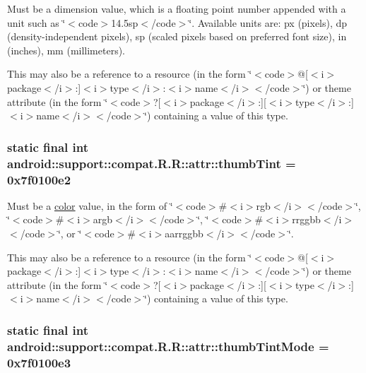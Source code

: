 Must be a dimension value, which is a floating point number appended with a unit such as \char`\"{}$<$code$>$14.5sp$<$/code$>$\char`\"{}. Available units are: px (pixels), dp (density-independent pixels), sp (scaled pixels based on preferred font size), in (inches), mm (millimeters). 

This may also be a reference to a resource (in the form \char`\"{}$<$code$>$@\mbox{[}$<$i$>$package$<$/i$>$:\mbox{]}$<$i$>$type$<$/i$>$:$<$i$>$name$<$/i$>$$<$/code$>$\char`\"{}) or theme attribute (in the form \char`\"{}$<$code$>$?\mbox{[}$<$i$>$package$<$/i$>$:\mbox{]}\mbox{[}$<$i$>$type$<$/i$>$:\mbox{]}$<$i$>$name$<$/i$>$$<$/code$>$\char`\"{}) containing a value of this type. \hypertarget{classandroid_1_1support_1_1compat_1_1_r_1_1attr_f9d5230d7f040b4a213add0d97d4421b}{
\subsubsection[{thumbTint}]{\setlength{\rightskip}{0pt plus 5cm}static final int android::support::compat.R.R::attr::thumbTint = 0x7f0100e2}}
\label{classandroid_1_1support_1_1compat_1_1_r_1_1attr_f9d5230d7f040b4a213add0d97d4421b}


Must be a \hyperlink{classandroid_1_1support_1_1compat_1_1_r_1_1color}{color} value, in the form of \char`\"{}$<$code$>$\#$<$i$>$rgb$<$/i$>$$<$/code$>$\char`\"{}, \char`\"{}$<$code$>$\#$<$i$>$argb$<$/i$>$$<$/code$>$\char`\"{}, \char`\"{}$<$code$>$\#$<$i$>$rrggbb$<$/i$>$$<$/code$>$\char`\"{}, or \char`\"{}$<$code$>$\#$<$i$>$aarrggbb$<$/i$>$$<$/code$>$\char`\"{}. 

This may also be a reference to a resource (in the form \char`\"{}$<$code$>$@\mbox{[}$<$i$>$package$<$/i$>$:\mbox{]}$<$i$>$type$<$/i$>$:$<$i$>$name$<$/i$>$$<$/code$>$\char`\"{}) or theme attribute (in the form \char`\"{}$<$code$>$?\mbox{[}$<$i$>$package$<$/i$>$:\mbox{]}\mbox{[}$<$i$>$type$<$/i$>$:\mbox{]}$<$i$>$name$<$/i$>$$<$/code$>$\char`\"{}) containing a value of this type. \hypertarget{classandroid_1_1support_1_1compat_1_1_r_1_1attr_39e61c27a8765be63b69ba7ac9e34581}{
\subsubsection[{thumbTintMode}]{\setlength{\rightskip}{0pt plus 5cm}static final int android::support::compat.R.R::attr::thumbTintMode = 0x7f0100e3}}
\label{classandroid_1_1support_1_1compat_1_1_r_1_1attr_39e61c27a8765be63b69ba7ac9e34581}



